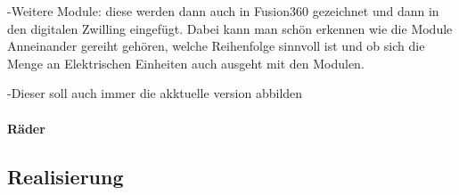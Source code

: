     -Weitere Module: diese werden dann auch in Fusion360 gezeichnet und dann in den digitalen Zwilling eingefügt. Dabei kann man schön erkennen wie die Module Anneinander gereiht gehören, welche Reihenfolge sinnvoll ist und ob sich die Menge an Elektrischen Einheiten auch ausgeht mit den Modulen. 

    -Dieser soll auch immer die akktuelle version abbilden

    \paragraph{Räder}
\subsection{Realisierung}
\label{sec:Schaltplan}



